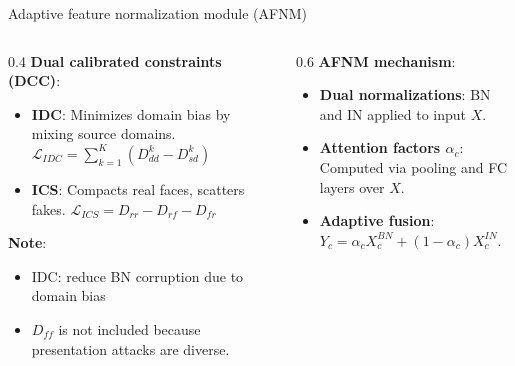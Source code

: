 \begin{frame}{Adaptive feature normalization module (AFNM)}
    \vspace{-1.0em}
    \begin{columns}[T]
        \begin{column}{0.4\textwidth}
            \small
            \textbf{Dual calibrated constraints (DCC)}:
            \begin{itemize}
                \item \textbf{IDC}: Minimizes domain bias by mixing source domains. $\mathcal{L}_{IDC} = \sum_{k=1}^{K} (D_{dd}^k - D_{sd}^k)$
                \item \textbf{ICS}: Compacts real faces, scatters fakes. $\mathcal{L}_{ICS} = D_{rr} - D_{rf} - D_{fr}$
            \end{itemize}
            \textbf{Note}: 
            \begin{itemize}
                \item IDC: reduce BN corruption due to domain bias
                \item $D_{ff}$ is not included because presentation attacks are diverse.
            \end{itemize}
        \end{column}
        \begin{column}{0.6\textwidth}
            \textbf{AFNM mechanism}:
            \begin{itemize}
                \item \textbf{Dual normalizations}: BN and IN applied to input $X$.
                \item \textbf{Attention factors $\alpha_c$}: Computed via pooling and FC layers over $X$.
                \item \textbf{Adaptive fusion}: $Y_c = \alpha_c X_{c}^{BN} + (1 - \alpha_c) X_{c}^{IN}$.
            \end{itemize}


\end{column}
\end{columns}
\end{frame}

